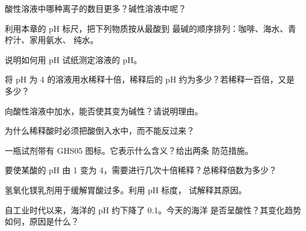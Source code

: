 \begin{exercise}[$\star$]\label{exo:g9:acids-bases-ph:2}
酸性溶液中哪种离子的数目更多？碱性溶液中呢？
\end{exercise}

\begin{exercise}[$\star$]\label{exo:g9:acids-bases-ph:3}
利用本章的 pH 标尺，把下列物质按从最酸到
最碱的顺序排列：咖啡、海水、青柠汁、家用氨水、
纯水。
\end{exercise}

\begin{exercise}[$\star$]\label{exo:g9:acids-bases-ph:4}
说明如何用 pH 试纸测定溶液的 pH。
\end{exercise}

\begin{exercise}[$\star\star$]\label{exo:g9:acids-bases-ph:5}
将 pH 为 4 的溶液用水稀释十倍，稀释后的 pH
约为多少？若稀释一百倍，又是多少？
\end{exercise}

\begin{exercise}[$\star\star$]\label{exo:g9:acids-bases-ph:6}
向酸性溶液中加水，能否使其变为碱性？请说明理由。
\end{exercise}

\begin{exercise}[$\star\star$]\label{exo:g9:acids-bases-ph:7}
为什么稀释酸时必须把酸倒入水中，而不能反过来？
\end{exercise}

\begin{exercise}[$\star\star$]\label{exo:g9:acids-bases-ph:8}
一瓶试剂带有 GHS05 图标。它表示什么含义？给出两条
防范措施。
\end{exercise}

\begin{exercise}[$\star\star$]\label{exo:g9:acids-bases-ph:9}
要使某酸的 pH 由 1 变为
4，需要进行几次十倍稀释？总稀释倍数为多少？
\end{exercise}

\begin{exercise}[$\star\star$]\label{exo:g9:acids-bases-ph:10}
氢氧化镁乳剂用于缓解胃酸过多。利用 pH 标度，
试解释其原因。
\end{exercise}

\begin{exercise}[$\star\star\star$]\label{exo:g9:acids-bases-ph:11}
自工业时代以来，海洋的 pH 约下降了 0.1。今天的海洋
是否呈酸性？其变化趋势如何，原因是什么？
\end{exercise}

